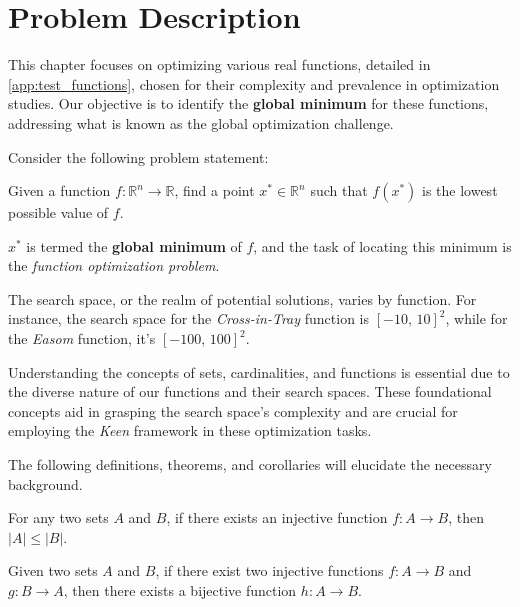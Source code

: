 \section{Problem Description}
\label{sec:fn_opt:problem}
    This chapter focuses on optimizing various real functions, detailed in \vref{app:test_functions}, chosen for their 
    complexity and prevalence in optimization studies. Our objective is to identify the \textbf{global minimum} for 
    these functions, addressing what is known as the global optimization challenge.

    Consider the following problem statement:

    \begin{displayquote}
        Given a function \(f : \mathbb{R}^n \to \mathbb{R}\), find a point \(x^* \in \mathbb{R}^n\) such that \(f(x^*)\) 
        is the lowest possible value of \(f\).
    \end{displayquote}
    
    \(x^*\) is termed the \textbf{global minimum} of \(f\), and the task of locating this minimum is the 
    \textit{function optimization problem}.

    The search space, or the realm of potential solutions, varies by function. For instance, the search space for the 
    \textit{Cross-in-Tray} function is \([-10,\,10]^2\), while for the \textit{Easom} function, it's \([-100,\,100]^2\).

    Understanding the concepts of sets, cardinalities, and functions is essential due to the diverse nature of our 
    functions and their search spaces. These foundational concepts aid in grasping the search space's complexity and 
    are crucial for employing the \textit{Keen} framework in these optimization tasks.
    
    The following definitions, theorems, and corollaries will elucidate the necessary background.

    \begin{definition}
    \label{def:fn_opt:cardinality_inequality}
        For any two sets \(A\) and \(B\), if there exists an injective function \(f : A \to B\), then \(|A| \leq |B|\).
    \end{definition}

    \begin{theorem}
    \label{thm:fn_opt:schroder_bernstein}
        Given two sets \(A\) and \(B\), if there exist two injective functions \(f : A \to B\) and \(g : B \to A\), 
        then there exists a bijective function \(h : A \to B\).
    \end{theorem}

